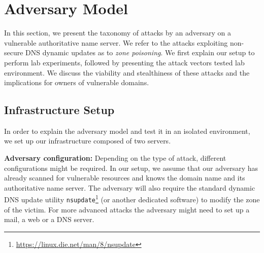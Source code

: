 \section{Adversary Model}

In this section, we present the taxonomy of attacks by an adversary on a vulnerable authoritative name server.
We refer to the attacks exploiting non-secure DNS dynamic updates as to \textit{zone poisoning}.
%
We first explain our setup to perform lab experiments, followed by 
presenting the attack vectors tested lab environment. 
We discuss the viability and stealthiness of these attacks and %
the implications for owners of vulnerable domains.


\subsection{Infrastructure Setup}

In order to explain the adversary model and test it in an isolated environment, we set up our infrastructure %
composed of two servers. 


\textbf{Adversary configuration:} Depending on the type of attack, different configurations might be required. 
In our setup, we assume that our adversary has already scanned for vulnerable 
resources and knows the domain name and its authoritative name server.
The adversary will also require the standard dynamic DNS update utility \texttt{nsupdate}\footnote{%
\url{https://linux.die.net/man/8/nsupdate}} (or another dedicated software) to modify the zone of the victim. %
For more advanced attacks the adversary might need to set up a mail, a web or a DNS server.


